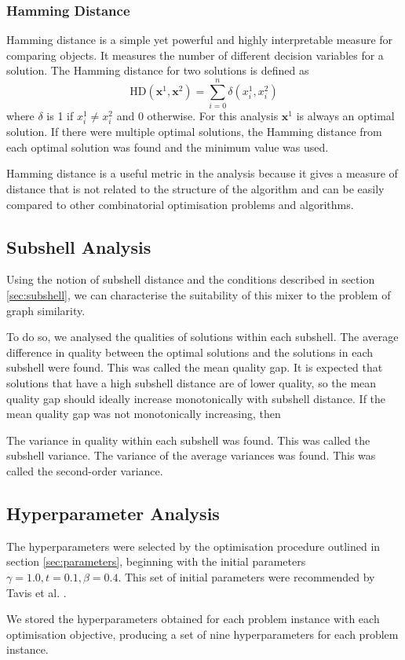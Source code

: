     \subsubsection{Hamming Distance}
Hamming distance is a simple yet powerful and highly interpretable measure for comparing objects. It measures the number of different decision variables for a solution. The Hamming distance for two solutions is defined as 
$$\text{HD}(\mathbf{x}^1,\mathbf{x}^2)=\sum_{i=0}^n \delta(x^1_i,x^2_i)$$
where $\delta$ is 1 if $x^1_i\neq x^2_i$ and 0 otherwise. For this analysis $\mathbf{x}^1$ is always an optimal solution. If there were multiple optimal solutions, the Hamming distance from each optimal solution was found and the minimum value was used.

Hamming distance is a useful metric in the analysis because it gives a measure of distance that is not related to the structure of the algorithm and can be easily compared to other combinatorial optimisation problems and algorithms.

    \subsection{Subshell Analysis}
Using the notion of subshell distance and the conditions described in section \ref{sec:subshell}, we can characterise the suitability of this mixer to the problem of graph similarity. 

To do so, we analysed the qualities of solutions within each subshell. The average difference in quality between the optimal solutions and the solutions in each subshell were found. This was called the mean quality gap. It is expected that solutions that have a high subshell distance are of lower quality, so the mean quality gap should ideally increase monotonically with subshell distance. If the mean quality gap was not monotonically increasing, then 

The variance in quality within each subshell was found. This was called the subshell variance. The variance of the average variances was found. This was called the second-order variance.

    \subsection{Hyperparameter Analysis}
The hyperparameters were selected by the optimisation procedure outlined in section \ref{sec:parameters}, beginning with the initial parameters $\gamma=1.0, t=0.1, \beta=0.4$. This set of initial parameters were recommended by Tavis et al. \cite{bennett2024nonvariational}.

We stored the hyperparameters obtained for each problem instance with each optimisation objective, producing a set of nine hyperparameters for each problem instance.